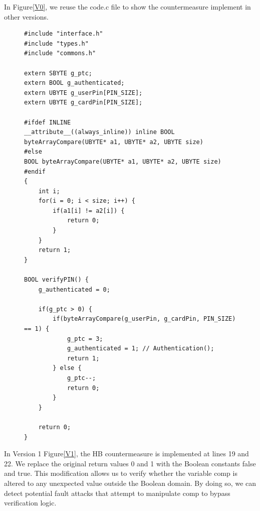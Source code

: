 In Figure\ref{V0}, we reuse the code.c file to show the countermeasure implement in other versions.
\begin{figure}
\begin{lstlisting}[caption={code.c of VerifyPin function in benchmark V0}, label={V0}, basicstyle=\ttfamily\footnotesize]
#include "interface.h"
#include "types.h"
#include "commons.h"

extern SBYTE g_ptc;
extern BOOL g_authenticated;
extern UBYTE g_userPin[PIN_SIZE];
extern UBYTE g_cardPin[PIN_SIZE];

#ifdef INLINE
__attribute__((always_inline)) inline BOOL byteArrayCompare(UBYTE* a1, UBYTE* a2, UBYTE size)
#else
BOOL byteArrayCompare(UBYTE* a1, UBYTE* a2, UBYTE size)
#endif
{
    int i;
    for(i = 0; i < size; i++) {
        if(a1[i] != a2[i]) {
            return 0;
        }
    }
    return 1;
}

BOOL verifyPIN() {
    g_authenticated = 0;

    if(g_ptc > 0) {
        if(byteArrayCompare(g_userPin, g_cardPin, PIN_SIZE) == 1) {
            g_ptc = 3;
            g_authenticated = 1; // Authentication();
            return 1;
        } else {
            g_ptc--;
            return 0;
        }
    }

    return 0;
}
\end{lstlisting}
\end{figure}

In Version 1 Figure\ref{V1}, the HB countermeasure is implemented at lines 19 and 22. We replace the original return values 0 and 1 with the Boolean constants false and true. This modification allows us to verify whether the variable comp is altered to any unexpected value outside the Boolean domain. By doing so, we can detect potential fault attacks that attempt to manipulate comp to bypass verification logic.

